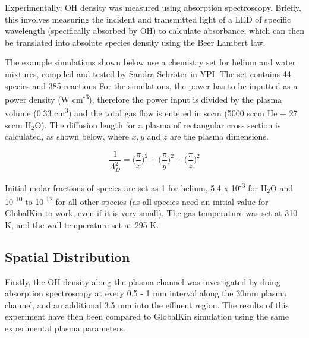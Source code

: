 \documentclass[11pt, oneside]{article}   	%
\begin{document}
Experimentally, OH density was measured using absorption spectroscopy.
Briefly, this involves measuring the incident and transmitted light of a LED of specific wavelength (specifically absorbed by OH) to calculate absorbance, which can then be translated into absolute species density using the Beer Lambert law.

The example simulations shown below use a chemistry set for helium and water mixtures, compiled and tested by Sandra Schr\"oter in YPI.
The set contains 44 species and 385 reactions %
For the simulations, the power has to be inputted as a power density (W cm\textsuperscript{-3}), therefore the power input is divided by the plasma volume (0.33 cm\textsuperscript{3}) and the total gas flow is entered in sccm (5000 sccm He + 27 sccm H$_2$O).
The diffusion length for a plasma of rectangular cross section is calculated, as shown below, where $x, y$ and $z$ are the plasma dimensions.

\begin{equation}
\frac{1}{\Lambda_D^2} = \Big(\frac{\pi}{x}\Big)^2 + \Big(\frac{\pi}{y}\Big)^2 + \Big(\frac{\pi}{z}\Big)^2
\end{equation}

Initial molar fractions of species are set as 1 for helium, 5.4 x 10\textsuperscript{-3} for H$_2$O and 10\textsuperscript{-10} to 10\textsuperscript{-12} for all other species (as all species need an initial value for GlobalKin to work, even if it is very small). 
The gas temperature was set at 310 K, and the wall temperature set at 295 K.


\subsection{Spatial Distribution}

Firstly, the OH density along the plasma channel was investigated by doing absorption spectroscopy at every 0.5 - 1 mm interval along the 30mm plasma channel, and an additional 3.5 mm into the effluent region.
The results of this experiment have then been compared to GlobalKin simulation using the same experimental plasma parameters.
\end{document}
